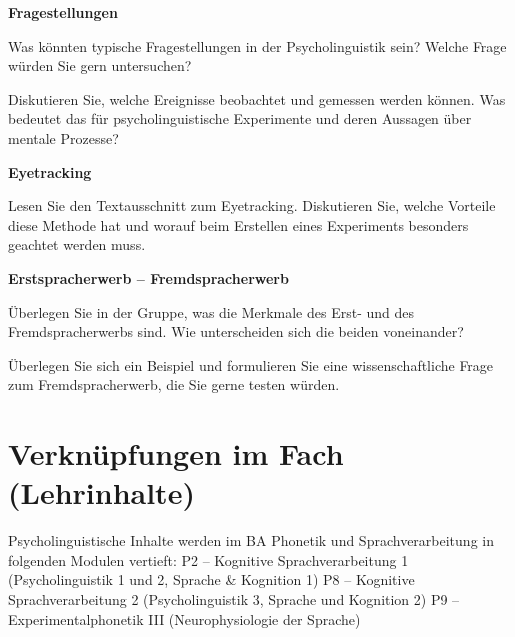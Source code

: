 \documentclass[11pt]{book}
\begin{document}
\textbf{Fragestellungen}

Was könnten typische Fragestellungen in der Psycholinguistik sein? Welche Frage würden Sie gern untersuchen?

Diskutieren Sie, welche Ereignisse beobachtet und gemessen werden können. Was bedeutet das für psycholinguistische Experimente und deren Aussagen über mentale Prozesse?

\vspace{1cm}

\textbf{Eyetracking}

Lesen Sie den Textausschnitt zum Eyetracking. Diskutieren Sie, welche Vorteile diese Methode hat und worauf beim Erstellen eines Experiments besonders geachtet werden muss.


\vspace{1cm}

\textbf{Erstspracherwerb – Fremdspracherwerb}

Überlegen Sie in der Gruppe, was die Merkmale des Erst- und des Fremdspracherwerbs sind. Wie unterscheiden sich die beiden voneinander?

Überlegen Sie sich ein Beispiel und formulieren Sie eine wissenschaftliche Frage zum Fremdspracherwerb, die Sie gerne testen würden.





\section{Verknüpfungen im Fach (Lehrinhalte)}
Psycholinguistische Inhalte werden im BA Phonetik und Sprachverarbeitung in folgenden Modulen vertieft:
P2 – Kognitive Sprachverarbeitung 1 (Psycholinguistik 1 und 2, Sprache \& Kognition 1)
P8 – Kognitive Sprachverarbeitung 2 (Psycholinguistik 3, Sprache und Kognition 2)
P9 – Experimentalphonetik III (Neurophysiologie der Sprache)
\end{document}
